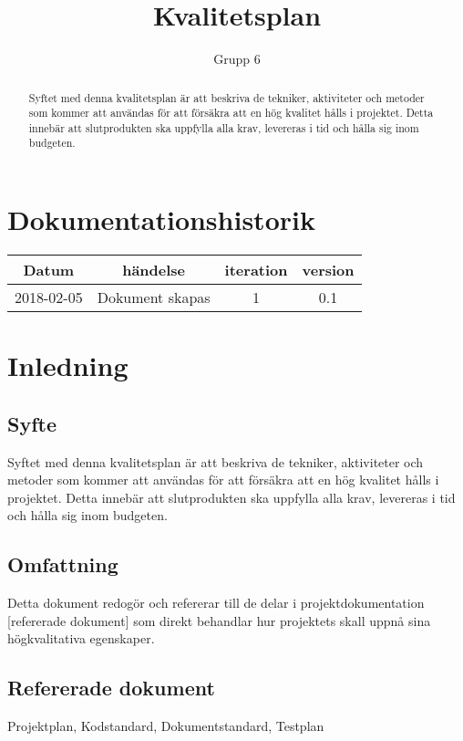\documentclass[a4paper,10pt]{article}
\title{Kvalitetsplan}
\author{Grupp 6}
\begin{document}
\begin{titlingpage}
    \maketitle
    \begin{abstract}
    \noindent Syftet med denna kvalitetsplan är att beskriva de tekniker, aktiviteter och metoder som kommer att användas för att försäkra att en hög kvalitet hålls i projektet. Detta innebär att slutprodukten ska uppfylla alla krav, levereras i tid och hålla sig inom budgeten. 
    \end{abstract}
\end{titlingpage}

\section{Dokumentationshistorik}
\label{sec:Dokumentation}



\begin{center}
 \begin{tabular}{|c c c c |} 
 \hline
 Datum & händelse & iteration & version\\ 
 \hline
 2018-02-05 & Dokument skapas & 1 &  0.1\\
 \hline
\end{tabular}
\end{center}

\section{Inledning}
\vspace{5mm}
\label{sec:Inledning}
\subsection{Syfte}
Syftet med denna kvalitetsplan är att beskriva de tekniker, aktiviteter och metoder som kommer att användas för att försäkra att en hög kvalitet hålls i projektet. Detta innebär att slutprodukten ska uppfylla alla krav, levereras i tid och hålla sig inom budgeten.
\subsection{Omfattning}
Detta dokument redogör och refererar till  de delar i projektdokumentation [refererade dokument] som direkt behandlar hur projektets skall uppnå sina högkvalitativa egenskaper.
\subsection{Refererade dokument}
Projektplan, Kodstandard, Dokumentstandard, Testplan
\end{document}
